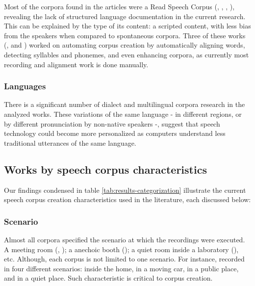 Most of the corpora found in the articles were a Read Speech Corpus (\cite{almeman2018building}, \cite{ruilan2016improving}, \cite{klessa2013paralingua}, \cite{clopper2006nationwide}), revealing the lack of structured language documentation in the current research. This can be explained by the type of its content: a scripted content, with less bias from the speakers when compared to spontaneous corpora. Three of these works (\cite{ng2017shefce}, \cite{mansikkaniemi2017automatic} and \cite{nagino2008building}) worked on automating corpus creation by automatically aligning words, detecting syllables and phonemes, and even enhancing corpora, as currently most recording and alignment work is done manually.

\subsubsection{Languages}

There is a significant number of dialect and multilingual corpora research in the analyzed works. These variations of the same language - in different regions, or by different pronunciation by non-native speakers -, suggest that speech technology could become more personalized as computers understand less traditional utterances of the same language.

\subsection{Works by speech corpus characteristics}

Our findings condensed in table \ref{tab:results-categorization} illustrate the
current speech corpus creation characteristics used in the literature, each discussed below:

\subsubsection{Scenario}

Almost all corpora specified the scenario at which the recordings were executed. A meeting room (\cite{liu2016sheffield}, \cite{moore2017sheffield}); a anechoic booth (\cite{goldman2016siwis}); a quiet room inside a laboratory (\cite{ramli2017first}), etc. Although, each corpus is not limited to one scenario. For instance, \cite{almeman2018building} recorded in four different scenarios: inside the home, in a moving car, in a public place, and in a quiet place. Such characteristic is critical to corpus creation.

